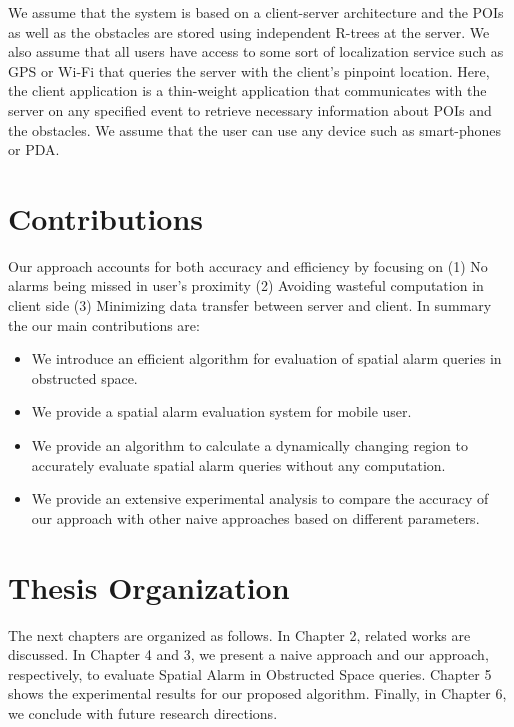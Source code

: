 We assume that the system is based on a client-server architecture and the POIs as well as the obstacles are stored using independent R-trees at the server. We also assume that all users have access to some sort of localization service such as GPS or Wi-Fi that queries the server with the client's pinpoint location. Here, the client application is a thin-weight application that communicates with the server on any specified event to retrieve necessary information about POIs and the obstacles. We assume that the user can use any device such as smart-phones or PDA.

\section{Contributions}

 Our approach accounts for both accuracy and efficiency by focusing on (1) No alarms being missed in user's proximity (2) Avoiding wasteful computation in client side (3) Minimizing data transfer between server and client. In summary the our main contributions are: 
\begin{itemize}
\setlength\itemsep{0em}
\item We introduce an efficient algorithm for evaluation of spatial alarm queries in obstructed space.
\item We provide a spatial alarm evaluation system for mobile user.
\item We provide an algorithm to calculate a dynamically changing region to accurately evaluate spatial alarm queries without any computation.
\item We provide an extensive experimental analysis to compare the accuracy of our approach with other naive approaches based on different parameters.
\end{itemize}

\vspace*{8pt}


\section{Thesis Organization}
\label{sec:org}

\vspace*{5pt}

The next chapters are organized as follows. In Chapter 2, related works are discussed. In Chapter 4 and 3, we present a naive approach and our approach, respectively, to evaluate Spatial Alarm in Obstructed Space queries. Chapter 5 shows the experimental results for our proposed algorithm. Finally, in Chapter 6, we conclude with future research directions.


